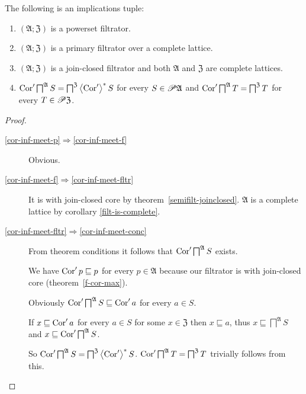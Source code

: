 \begin{thm}
\label{dual-cor-inf-meet}The following is an implications tuple:
\begin{enumerate}
\item \label{cor-inf-meet-p}$(\mathfrak{A};\mathfrak{Z})$ is a powerset
filtrator.
\item \label{cor-inf-meet-f}$(\mathfrak{A};\mathfrak{Z})$ is a primary filtrator
over a complete lattice.
\item \label{cor-inf-meet-fltr}$(\mathfrak{A};\mathfrak{Z})$ is a join-closed
filtrator and both $\mathfrak{A}$ and $\mathfrak{Z}$ are complete
lattices.
\item \label{cor-inf-meet-conc}$\operatorname{Cor}'\bigsqcap^{\mathfrak{A}}S=\bigsqcap^{\mathfrak{Z}}\left\langle \operatorname{Cor}'\right\rangle ^{\ast}S$
for every $S\in\mathscr{P}\mathfrak{A}$ and $\operatorname{Cor}'\bigsqcap^{\mathfrak{A}}T=\bigsqcap^{\mathfrak{Z}}T$
for every $T\in\mathscr{P}\mathfrak{Z}$.
\end{enumerate}
\end{thm}
\begin{proof}
~
\begin{description}
\item [{\ref{cor-inf-meet-p}$\Rightarrow$\ref{cor-inf-meet-f}}] Obvious.
\item [{\ref{cor-inf-meet-f}$\Rightarrow$\ref{cor-inf-meet-fltr}}] It
is with join-closed core by theorem~\ref{semifilt-joinclosed}.
$\mathfrak{A}$ is a complete lattice by corollary \ref{filt-is-complete}.
\item [{\ref{cor-inf-meet-fltr}$\Rightarrow$\ref{cor-inf-meet-conc}}] From
theorem conditions it follows that $\operatorname{Cor}'\bigsqcap^{\mathfrak{A}}S$
exists.


We have $\operatorname{Cor}'p\sqsubseteq p$ for every $p\in\mathfrak{A}$ because
our filtrator is with join-closed core (theorem~\ref{f-cor-max}).


Obviously $\operatorname{Cor}'\bigsqcap^{\mathfrak{A}}S\sqsubseteq\operatorname{Cor}'a$ for every
$a\in S$.


If $x\sqsubseteq\operatorname{Cor}'a$ for every $a\in S$ for some $x\in\mathfrak{Z}$
then $x\sqsubseteq a$, thus $x\sqsubseteq\bigsqcap^{\mathfrak{A}}S$
and $x\sqsubseteq\operatorname{Cor}'\bigsqcap^{\mathfrak{A}}S$.


So $\operatorname{Cor}'\bigsqcap^{\mathfrak{A}}S=\bigsqcap^{\mathfrak{Z}}\left\langle \operatorname{Cor}'\right\rangle ^{\ast}S$.
$\operatorname{Cor}'\bigsqcap^{\mathfrak{A}}T=\bigsqcap^{\mathfrak{Z}}T$ trivially
follows from this.

\end{description}
\end{proof}
